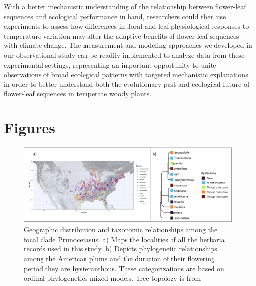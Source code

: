 \documentclass{article}[11pt]
\begin{document}
{With a better mechanistic understanding of the relationship between flower-leaf sequences and ecological performance in hand, researchers could then use experiments to assess how differences in floral and leaf physiological responses to temperature variation may alter the adaptive benefits of flower-leaf sequences with climate change. The measurement and modeling approaches we developed in our observational study can be readily implemented to analyze data from these experimental settings, representing an important opportunity to unite observations of broad ecological patterns with targeted mechanistic explanations in order to better understand both the evolutionary past and ecological future of flower-leaf sequences in temperate woody plants.




 

\newpage
\section*{Figures}


\begin{figure}[h!]
  \centering
 \includegraphics[width=\textwidth]{..//..//Plots/fig1_new.jpg}
    \caption{Geographic distribution and taxonomic relationships among the focal clade Prunocerasus. a) Maps the localities of all the herbaria records used in this study. b) Depicts phylogenetic relationships among the American plums and the duration of their flowering period they are hysteranthous. These categorizations are based on ordinal phylogenetics mixed models. Tree topology is from \citet{Shaw:2004aa}}
    \label{fig:phylo2}
\end{figure}



}
\end{document}
